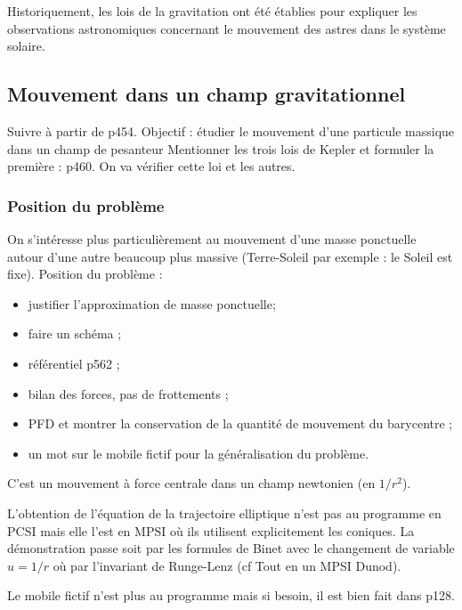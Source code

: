 \begin{transition}
Historiquement, les lois de la gravitation ont été établies pour expliquer les observations astronomiques concernant le mouvement des astres dans le système solaire.
\end{transition}

\subsection{Mouvement dans un champ gravitationnel}

Suivre \cite{Michel2017} à partir de p454.
Objectif : étudier le mouvement d'une particule massique dans un champ de pesanteur
Mentionner les trois lois de Kepler et formuler la première : \cite{Michel2017} p460.
On va vérifier cette loi et les autres.

\subsubsection{Position du problème}

On s'intéresse plus particulièrement au mouvement d'une masse ponctuelle autour d'une autre beaucoup plus massive (Terre-Soleil par exemple : le Soleil est fixe).
Position du problème :
\begin{itemize}
\item justifier l'approximation de masse ponctuelle;
\item faire un schéma ;
\item référentiel \cite{Salamito2016} p562 ;
\item bilan des forces, pas de frottements ;
\item PFD et montrer la conservation de la quantité de mouvement du barycentre ;
\item un mot sur le mobile fictif pour la généralisation du problème.
\end{itemize}

C'est un mouvement à force centrale dans un champ newtonien (en $1/r^2$).

\begin{remarque}
L'obtention de l'équation de la trajectoire elliptique n'est pas au programme en PCSI mais elle l'est en MPSI où ils utilisent explicitement les coniques.
La démonstration passe soit par les formules de Binet avec le changement de variable $u=1/r$ où par l'invariant de Runge-Lenz (cf Tout en un MPSI Dunod).

\noindent
Le mobile fictif n'est plus au programme mais si besoin, il est bien fait dans \cite{Bocquet2002} p128.
\end{remarque}


